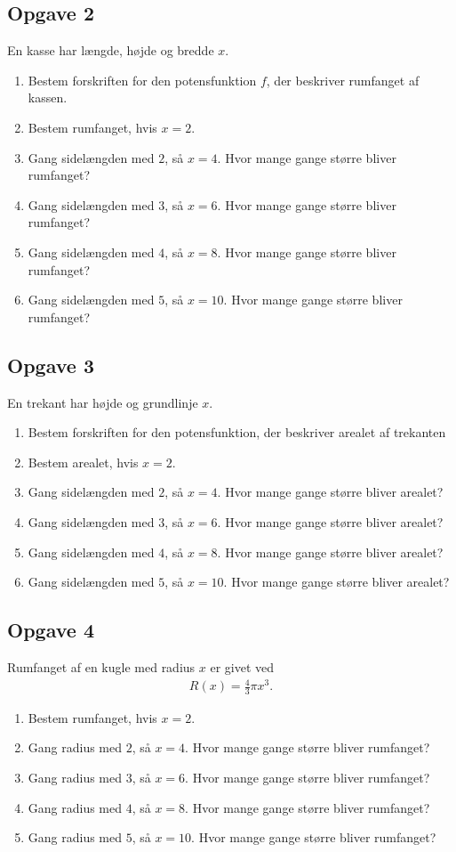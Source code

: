 \subsection*{Opgave 2}
En kasse har længde, højde og bredde $x$. 
\begin{enumerate}[label=\roman*)]
	\item Bestem forskriften for den potensfunktion $f$, der beskriver rumfanget af kassen.
	\item Bestem rumfanget, hvis $x = 2$.
	\item Gang sidelængden med $2$, så $x = 4$. Hvor mange gange større bliver rumfanget?
	\item Gang sidelængden med $3$, så $x = 6$. Hvor mange gange større bliver rumfanget?
	\item Gang sidelængden med $4$, så $x = 8$. Hvor mange gange større bliver rumfanget?
	\item Gang sidelængden med $5$, så $x = 10$. Hvor mange gange større bliver rumfanget?
\end{enumerate}

\subsection*{Opgave 3}
En trekant har højde og grundlinje $x$. 
\begin{enumerate}[label = \roman*)]
	\item Bestem forskriften for den potensfunktion, der beskriver arealet af trekanten
	\item Bestem arealet, hvis $x = 2$.
	\item Gang sidelængden med $2$, så $x = 4$. Hvor mange gange større bliver arealet?
	\item Gang sidelængden med $3$, så $x = 6$. Hvor mange gange større bliver arealet?
	\item Gang sidelængden med $4$, så $x = 8$. Hvor mange gange større bliver arealet?
	\item Gang sidelængden med $5$, så $x = 10$. Hvor mange gange større bliver arealet?
\end{enumerate}

\subsection*{Opgave 4}
Rumfanget af en kugle med radius $x$ er givet ved
\begin{align*}
	R(x) = \frac{4}{3}\pi x^3.
\end{align*}
\begin{enumerate}[label = \roman*)]
	\item Bestem rumfanget, hvis $x = 2$.
	\item Gang radius med $2$, så $x = 4$. Hvor mange gange større bliver rumfanget?
	\item Gang radius med $3$, så $x = 6$. Hvor mange gange større bliver rumfanget?
	\item Gang radius med $4$, så $x = 8$. Hvor mange gange større bliver rumfanget?
	\item Gang radius med $5$, så $x = 10$. Hvor mange gange større bliver rumfanget?
\end{enumerate}

